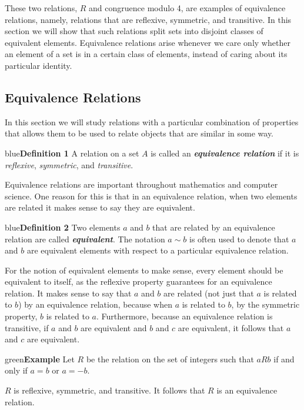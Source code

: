 \documentclass[11pt]{article}
\newenvironment{example}[1][\unskip]{\begin{mybox}{green}{\textbf{Example} {#1}}}{\end{mybox}}
\newenvironment{definition}[1]{\begin{mybox}{blue}{\textbf{Definition #1}}}{\end{mybox}}
\begin{document}
These two relations, $R$ and congruence modulo 4, are examples of equivalence relations, namely, relations that are reflexive, symmetric, and transitive. In this section we will show that such relations split sets into disjoint classes of equivalent elements. Equivalence relations arise whenever we care only whether an element of a set is in a certain class of elements, instead of caring about its particular identity.

\subsection{Equivalence Relations}

In this section we will study relations with a particular combination of properties that allows them to be used to relate objects that are similar in some way.

\begin{definition}{1}
A relation on a set $A$ is called an \textit{\textbf{equivalence relation}} if it is \textit{reflexive}, \textit{symmetric}, and \textit{transitive}.
\end{definition}

Equivalence relations are important throughout mathematics and computer science. One reason for this is that in an equivalence relation, when two elements are related it makes sense to say they are equivalent.

\begin{definition}{2}
Two elements $a$ and $b$ that are related by an equivalence relation are called \textit{\textbf{equivalent}}. The notation $a \sim b$ is often used to denote that $a$ and $b$ are equivalent elements with respect to a particular equivalence relation.
\end{definition}

For the notion of equivalent elements to make sense, every element should be equivalent to itself, as the reflexive property guarantees for an equivalence relation. It makes sense to say that $a$ and $b$ are related (not just that $a$ is related to $b$) by an equivalence relation, because when $a$ is related to $b$, by the symmetric property, $b$ is related to $a$. Furthermore, because an equivalence relation is transitive, if $a$ and $b$ are equivalent and $b$ and $c$ are equivalent, it follows that $a$ and $c$ are equivalent.

\begin{example}
Let $R$ be the relation on the set of integers such that $a R b$ if and only if $a = b$ or $a = -b$.

$R$ is reflexive, symmetric, and transitive. It follows that $R$ is an equivalence relation.
\end{example}
\end{document}
